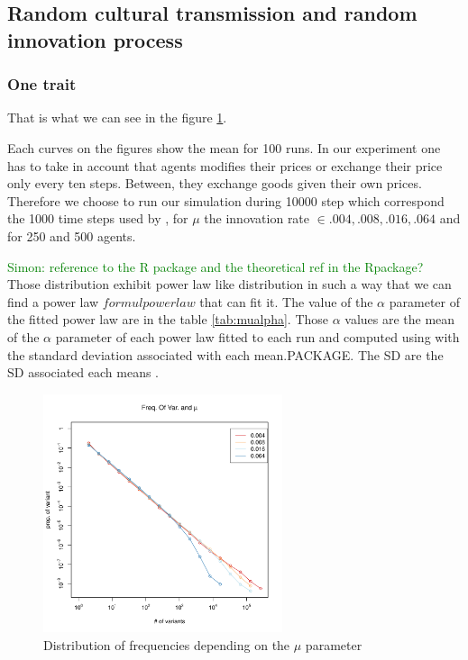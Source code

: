 \documentclass{wscpaperproc}
\newcommand{\memo}[2]{\textcolor{#1}{#2}}
\newcommand{\simon}[1]{\memo{green}{Simon: #1\\}}
\begin{document}
\subsection{Random cultural transmission and random innovation process}
\subsubsection{One trait}

That is what we can see in the figure \ref{fig:allMutation}.

Each curves on the figures show the mean for 100 runs. In our experiment one has to take in account that agents modifies their prices or exchange their price only every ten steps. Between, they exchange goods given their own prices. Therefore we choose to run our simulation during 10000 step which correspond the 1000 time steps used by \cite{bentley_random_2004,mesoudi_random_2009}, for $\mu$ the innovation rate $\in {.004,.008,.016,.064}$ and for 250 and 500 agents.

\simon{reference to the R package and the theoretical ref in the Rpackage?}
Those distribution exhibit power law like distribution in such a way that we can find a power law $formul powerlaw$ that can fit it. The value of the $\alpha$ parameter of the fitted power law are in the table \ref{tab:mualpha}. Those $\alpha$ values are the mean of the $\alpha$ parameter of each power law fitted to each run and computed using with the standard deviation associated with each mean.PACKAGE. The SD are the SD associated each means .
\begin{figure}[hbp]
	\begin{center}
		\includegraphics[width=7cm]{img/allmuRandMaxBentleyValues.pdf}
	\end{center}
	\caption{Distribution of frequencies depending on the $\mu$ parameter}
	\label{fig:allMutation}
\end{figure}
\end{document}
